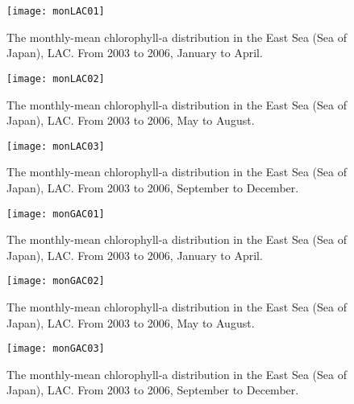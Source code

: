 \begin{figure}[h]
	\centering
	\texttt{[image: monLAC01]}\\
	\caption{The monthly-mean chlorophyll-a distribution in the East Sea (Sea of Japan), LAC. From 2003 to 2006, January to April.}
	\label{fig:monLAC01}
\end{figure}


\begin{figure}[h]
	\centering
	\texttt{[image: monLAC02]}\\
	\caption{The monthly-mean chlorophyll-a distribution in the East Sea (Sea of Japan), LAC. From 2003 to 2006, May to August.}
	\label{fig:monLAC02}
\end{figure}

\begin{figure}[h]
	\centering
	\texttt{[image: monLAC03]}\\
	\caption{The monthly-mean chlorophyll-a distribution in the East Sea (Sea of Japan), LAC. From 2003 to 2006, September to December.}
	\label{fig:monLAC03}
\end{figure}


\begin{figure}[h]
	\centering
	\texttt{[image: monGAC01]}\\
	\caption{The monthly-mean chlorophyll-a distribution in the East Sea (Sea of Japan), LAC. From 2003 to 2006, January to April.}
	\label{fig:monGAC01}
\end{figure}


\begin{figure}[h]
	\centering
	\texttt{[image: monGAC02]}\\
	\caption{The monthly-mean chlorophyll-a distribution in the East Sea (Sea of Japan), LAC. From 2003 to 2006, May to August.}
	\label{fig:monGAC02}
\end{figure}


\begin{figure}[h]
	\centering
	\texttt{[image: monGAC03]}\\
	\caption{The monthly-mean chlorophyll-a distribution in the East Sea (Sea of Japan), LAC. From 2003 to 2006, September to December.}
	\label{fig:monGAC03}
\end{figure}
